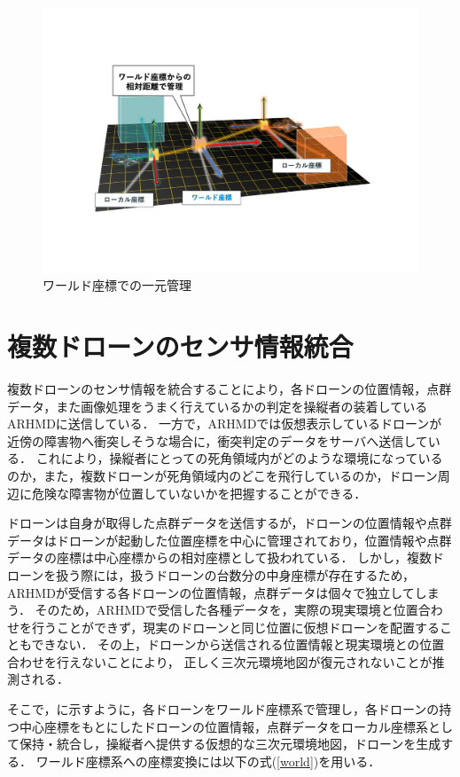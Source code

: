 \documentclass[a4paper,11pt]{ujreport}
\begin{document}
\begin{figure}[bt]
  \centering
  \includegraphics[width=0.8\linewidth]{img/03_cordinate.pdf}
  \caption{ワールド座標での一元管理}
  \label{fig:03_cordinate}
\end{figure}

\section{複数ドローンのセンサ情報統合}
\label{sec:SensorIntegration}

複数ドローンのセンサ情報を統合することにより，各ドローンの位置情報，点群データ，また画像処理をうまく行えているかの判定を操縦者の装着しているARHMDに送信している．
一方で，ARHMDでは仮想表示しているドローンが近傍の障害物へ衝突しそうな場合に，衝突判定のデータをサーバへ送信している．
これにより，操縦者にとっての死角領域内がどのような環境になっているのか，また，複数ドローンが死角領域内のどこを飛行しているのか，ドローン周辺に危険な障害物が位置していないかを把握することができる．

ドローンは自身が取得した点群データを送信するが，ドローンの位置情報や点群データはドローンが起動した位置座標を中心に管理されており，位置情報や点群データの座標は中心座標からの相対座標として扱われている．
しかし，複数ドローンを扱う際には，扱うドローンの台数分の中身座標が存在するため，ARHMDが受信する各ドローンの位置情報，点群データは個々で独立してしまう．
そのため，ARHMDで受信した各種データを，実際の現実環境と位置合わせを行うことができず，現実のドローンと同じ位置に仮想ドローンを配置することもできない．
その上，ドローンから送信される位置情報と現実環境との位置合わせを行えないことにより，
正しく三次元環境地図が復元されないことが推測される．

そこで，に示すように，各ドローンをワールド座標系で管理し，各ドローンの持つ中心座標をもとにしたドローンの位置情報，点群データをローカル座標系として保持・統合し，操縦者へ提供する仮想的な三次元環境地図，ドローンを生成する．
ワールド座標系への座標変換には以下の式(\ref{world})を用いる．
\end{document}
